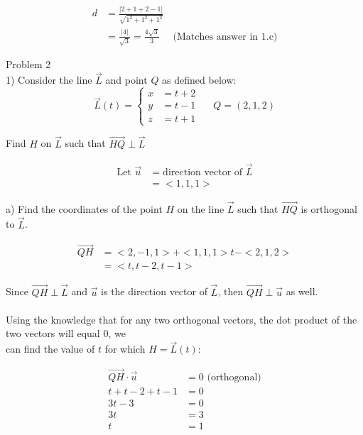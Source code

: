 \documentclass{article}
\begin{document}
\begin{align*}
d &= \frac{| 2 + 1 + 2 - 1 |}{\sqrt{1^2 + 1^2 + 1^2}} \\
&= \frac{| 4 |}{\sqrt{3}} = \frac{4\sqrt{3}}{3} \quad \text{ (Matches answer in 1.c)}
\end{align*}



\begin{text}
Problem 2 \\

1) Consider the line $\vec{L}$ and point $Q$ as defined below:
\[\vec{L}(t) = \left\{
  \begin{array}{lr}
    x &= t + 2 \\
    y &= t - 1 \\
    z &= t + 1
  \end{array}
\right.
\;\;\;\;\;
Q = (2,1,2)
\]

\indent\indent Find $H$ on $\vec{L}$ such that $\vec{HQ} \perp \vec{L}$
\end{text}

\begin{align*}
\text{Let } \vec{u} &= \text{direction vector of } \vec{L} \\
&= <1,1,1>
\end{align*}

\begin{text}
\indent a) Find the coordinates of the point $H$ on the line $\vec{L}$ such that $\vec{HQ}$ is orthogonal to $\vec{L}$.
\end{text}

\begin{align*}
\vec{QH} &= <2, -1, 1> + <1,1,1>t - <2,1,2> \\
         &= <t, t-2, t-1>
\end{align*}

\begin{text}
\indent\indent Since $\vec{QH} \perp \vec{L}$ and $\vec{u}$ is the direction vector of $\vec{L}$, then $\vec{QH} \perp \vec{u}$ as well. \\ \\
\indent\indent\indent Using the knowledge that for any two orthogonal vectors, the dot product of the two vectors will equal $0$, we \\
\indent\indent\indent can find the value of $t$ for which $H = \vec{L}(t)$:
\end{text}

\begin{align*}
\vec{QH} \cdot \vec{u} &= 0  \text{ (orthogonal)}\\
t + t - 2 + t -1 &= 0 \\
3t - 3 &= 0 \\
3t &= 3 \\
t &= 1
\end{align*}
\end{document}
